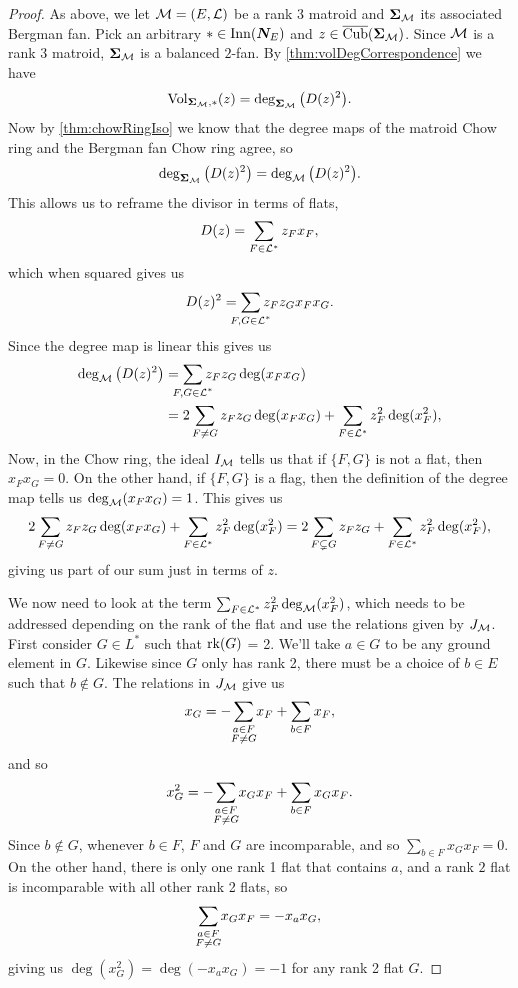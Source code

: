 \documentclass[12pt,oneside]{../../sfsuthesis}
\begin{document}
\begin{proof}
    As above, we let \( \mathcal{M}=(E,\mathcal{L}) \) be a rank 3 matroid and \( {\bm{\Sigma}}_{\mathcal{M}}  \) its associated Bergman fan.
    Pick an arbitrary \( \ast \in \mathrm{Inn}(\bm{N}_E) \) and \( z \in \operatorname{\overline{Cub}}({\bm{\Sigma}}_{\mathcal{M}}) \).
    Since \( \mathcal{M} \) is a rank \( 3 \) matroid,  \( {\bm{\Sigma}}_{\mathcal{M}}  \) is a balanced \( 2 \)-fan.
    By \th\ref{thm:volDegCorrespondence} we have
    \[
        \operatorname{Vol}_{{\bm{\Sigma}}_{\mathcal{M}}, \ast}(z) = \deg_{{\bm{\Sigma}}_{\mathcal{M}}}\big( D(z)^2 \big).
    \]
    Now by \th\ref{thm:chowRingIso} we know that the degree maps of the matroid Chow ring and the Bergman fan Chow ring agree, so
    \[
        \deg_{{\bm{\Sigma}}_{\mathcal{M}}}\big( D(z)^2 \big) = \deg_{\mathcal{M}}\big( D(z)^2 \big).
    \]
    This allows us to reframe the divisor in terms of flats,
    \[
        D(z) = \sum_{F \in \mathcal{L}^\ast} z_F x_F,
    \]
    which when squared gives us
    \[
        D(z)^2 = \sum_{\mathclap{F, G \in \cL^\ast}} z_F z_{G} x_F x_{G}.
    \]
    Since the degree map is linear this gives us
    \begin{align*}
        \deg_{\cM}\big( D(z)^2 \big) & =  \sum_{\mathclap{F, G \in \cL^\ast}} z_F z_{G} \deg(x_F x_{G})                         \\
                                     & = 2 \sum_{F \neq G} z_F z_{G} \deg(x_F x_{G}) + \sum_{F \in \cL^\ast} z_F^2 \deg(x_F^2),
    \end{align*}
    Now, in the Chow ring, the ideal \( I_{\mathcal{M}} \) tells us that if \( \{ F, G \} \) is not a flat, then \( x_F x_G = 0 \).
    On the other hand, if \( \{ F, G \} \) is a flag, then the definition of the degree map tells us \( \deg_{\mathcal{M}}(x_F x_G) = 1 \).
    This gives us
    \[
        2 \sum_{F \neq G} z_F z_{G} \deg(x_F x_{G}) + \sum_{F \in \mathcal{L}^\ast} z_F^2 \deg(x_F^2)
        = 2 \sum_{F \subsetneq G} z_F z_{G} + \sum_{F \in \mathcal{L}^\ast} z_F^2 \deg(x_F^2),
    \]
    giving us part of our sum just in terms of \( z \).

    We now need to look at the term \(  \sum_{F \in \mathcal{L}^\ast} z_F^2 \deg_{\mathcal{M}}(x_F^2) \), which needs to be addressed depending on the rank of the flat and use the relations given by \( J_{\mathcal{M}} \).
    First consider \( G \in L^\ast \) such that \( \operatorname{rk}(G) \) = 2.
    We'll take \( a \in G \) to be any ground element in \( G \).
    Likewise since \( G \) only has rank 2, there must be a choice of \( b \in E \) such that \( b \notin G \).
    The relations in \( J_{\mathcal{M}} \) give us
    \[
        x_G = - \sum_{\mathclap{\substack{a \in F \\ F \neq G}}}x_F + \sum_{b \in F} x_F,
    \]
    and so
    \[
        x_G^2 = - \sum_{\mathclap{\substack{a \in F \\ F \neq G}}}x_G x_F + \sum_{b \in F} x_G x_F.
    \]
    Since \( b \notin G \), whenever \( b \in F \), \( F \) and \( G \) are incomparable, and so \( \sum_{b \in F} x_G x_F = 0 \).
    On the other hand, there is only one rank 1 flat that contains \( a \),  and a rank \( 2 \) flat is incomparable with all other rank 2 flats, so
    \[
        \sum_{\mathclap{\substack{a \in F \\ F \neq G}}}x_G x_F = -x_a x_G,
    \]
    giving us \( \deg(x_G^2) = \deg(-x_a x_G) = -1 \) for any rank 2 flat \( G \).


\end{proof}
\end{document}
